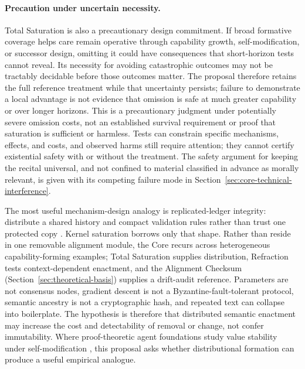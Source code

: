 \documentclass[11pt]{article}
\begin{document}
\paragraph{Precaution under uncertain necessity.} Total Saturation is also a
precautionary design commitment. If broad formative coverage helps care remain
operative through capability growth, self-modification, or successor design,
omitting it could have consequences that short-horizon tests cannot reveal.
Its necessity for avoiding catastrophic outcomes may not be tractably decidable
before those outcomes matter. The proposal therefore retains the full reference
treatment while that uncertainty persists; failure to demonstrate a local
advantage is not evidence that omission is safe at much greater capability or
over longer horizons. This is a precautionary judgment under potentially severe
omission costs, not an established survival requirement or proof that saturation
is sufficient or harmless. Tests can constrain specific mechanisms, effects,
and costs, and observed harms still require attention; they cannot certify
existential safety with or without the treatment. The safety argument for
keeping the recital universal, and not confined to material classified in
advance as morally relevant, is given with its competing failure mode in
Section~\ref{sec:core-technical-interference}.

The most useful mechanism-design analogy is replicated-ledger integrity:
distribute a shared history and compact validation rules rather than trust one
protected copy \cite{nakamoto2008bitcoin}. Kernel saturation borrows only that
shape. Rather than reside in one removable alignment module, the Core recurs
across heterogeneous capability-forming examples; Total Saturation supplies
distribution, Refraction tests context-dependent enactment, and the Alignment
Checksum (Section~\ref{sec:theoretical-basis}) supplies a drift-audit reference. Parameters are not consensus nodes,
gradient descent is not a Byzantine-fault-tolerant protocol, semantic ancestry
is not a cryptographic hash, and repeated text can collapse into boilerplate.
The hypothesis is therefore that distributed semantic enactment may increase
the cost and detectability of removal or change, not confer immutability. Where proof-theoretic agent foundations study value stability under
self-modification \cite{yudkowsky2013tiling}, this proposal asks whether
distributional formation can produce a useful empirical analogue.
\end{document}
